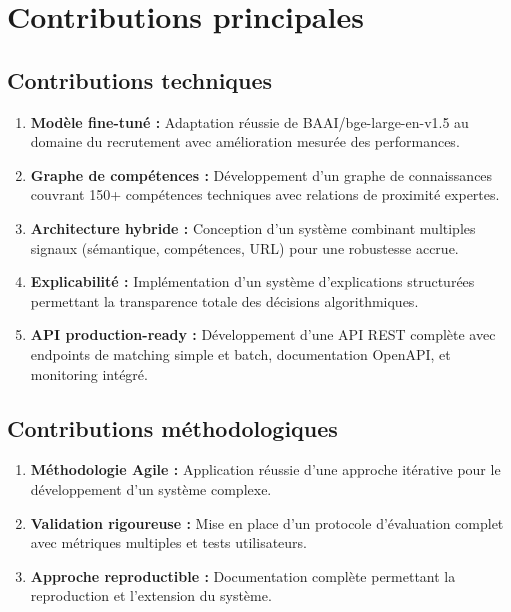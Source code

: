 \documentclass[12pt,a4paper]{report}
\begin{document}
\section{Contributions principales}

\subsection{Contributions techniques}

\begin{enumerate}
\item {\color{primarygreen}\textbf{Modèle fine-tuné :}} Adaptation réussie de BAAI/bge-large-en-v1.5 au domaine du recrutement avec amélioration mesurée des performances.

\item {\color{darkgreen}\textbf{Graphe de compétences :}} Développement d'un graphe de connaissances couvrant 150+ compétences techniques avec relations de proximité expertes.

\item {\color{primarygreen}\textbf{Architecture hybride :}} Conception d'un système combinant multiples signaux (sémantique, compétences, URL) pour une robustesse accrue.

\item {\color{darkgreen}\textbf{Explicabilité :}} Implémentation d'un système d'explications structurées permettant la transparence totale des décisions algorithmiques.

\item {\color{primarygreen}\textbf{API production-ready :}} Développement d'une API REST complète avec endpoints de matching simple et batch, documentation OpenAPI, et monitoring intégré.
\end{enumerate}

\subsection{Contributions méthodologiques}

\begin{enumerate}
\item {\color{darkgreen}\textbf{Méthodologie Agile :}} Application réussie d'une approche itérative pour le développement d'un système complexe.

\item {\color{primarygreen}\textbf{Validation rigoureuse :}} Mise en place d'un protocole d'évaluation complet avec métriques multiples et tests utilisateurs.

\item {\color{darkgreen}\textbf{Approche reproductible :}} Documentation complète permettant la reproduction et l'extension du système.
\end{enumerate}
\end{document}
